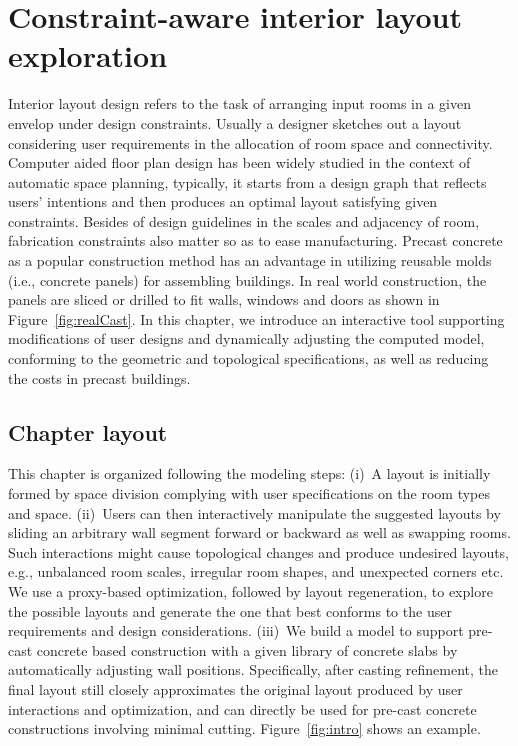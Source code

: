 

\chapter{Constraint-aware interior layout exploration}
\label{chapter3}

Interior layout design refers to the task of arranging input rooms in a given envelop under design constraints. Usually a designer sketches out a layout considering user requirements in the allocation of room space and connectivity. Computer aided floor plan design has been widely studied in the context of automatic space planning, typically, it starts from a design graph that reflects users' intentions and then produces an optimal layout satisfying given constraints. Besides of design guidelines in the scales and adjacency of room, fabrication constraints also matter so as to ease manufacturing. Precast concrete as a popular construction method has an advantage in utilizing reusable molds (i.e., concrete panels) for assembling buildings. In real world construction, the panels are sliced or drilled to fit walls, windows and doors as shown in Figure~\ref{fig:realCast}. In this chapter, we introduce an interactive tool supporting modifications of user designs and dynamically adjusting the computed model, conforming to the geometric and topological specifications, as well as reducing the costs in precast buildings.

\section{Chapter layout}

This chapter is organized following the modeling steps:
(i)~A layout is initially formed by space division complying with user specifications on the room types and space.
(ii)~Users can then interactively manipulate the suggested layouts by sliding an arbitrary wall segment forward or backward as well as swapping rooms. Such interactions might cause topological changes and produce undesired layouts, e.g., unbalanced room scales, irregular room shapes, and unexpected corners etc. We use a proxy-based optimization, followed by layout regeneration, to explore the possible layouts and generate the one that best conforms to the user requirements and design considerations.
(iii)~We build a model to support pre-cast concrete based construction with a given library of concrete slabs by automatically adjusting wall positions. Specifically, after casting refinement, the final layout still closely approximates the original layout produced by user interactions and optimization, and can directly be used for pre-cast concrete constructions involving minimal cutting. Figure~\ref{fig:intro} shows an example.

